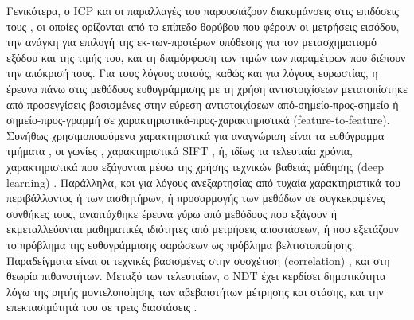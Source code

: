 Γενικότερα, ο ICP και οι παραλλαγές του παρουσιάζουν διακυμάνσεις στις
επιδόσεις τους \cite{Donoso2017b}, οι οποίες ορίζονται από το επίπεδο θορύβου
που φέρουν οι μετρήσεις εισόδου, την ανάγκη για επιλογή της εκ-των-προτέρων
υπόθεσης για τον μετασχηματισμό εξόδου και της τιμής του, και τη διαμόρφωση των
τιμών των παραμέτρων που διέπουν την απόκρισή τους. Για τους λόγους αυτούς,
καθώς και για λόγους ευρωστίας, η έρευνα πάνω στις μεθόδους ευθυγράμμισης με τη
χρήση αντιστοιχίσεων μετατοπίστηκε από προσεγγίσεις βασισμένες στην εύρεση
αντιστοιχίσεων από-σημείο-προς-σημείο ή σημείο-προς-γραμμή σε
χαρακτηριστικά-προς-χαρακτηριστικά (feature-to-feature). Συνήθως
χρησιμοποιούμενα χαρακτηριστικά για αναγνώριση είναι τα ευθύγραμμα τμήματα
\cite{XuZezhong,Mohamed2017,Wen2018}, οι γωνίες \cite{Wang2018b},
χαρακτηριστικά SIFT \cite{Li2016}, ή, ιδίως τα τελευταία χρόνια, χαρακτηριστικά
που εξάγονται μέσω της χρήσης τεχνικών βαθειάς μάθησης (deep learning)
\cite{Li2017,Li2020}. Παράλληλα, και για λόγους ανεξαρτησίας από τυχαία
χαρακτηριστικά του περιβάλλοντος ή των αισθητήρων, ή προσαρμογής των μεθόδων σε
συγκεκριμένες συνθήκες τους, αναπτύχθηκε έρευνα γύρω από μεθόδους που εξάγουν ή
εκμεταλλεύονται μαθηματικές ιδιότητες από μετρήσεις αποστάσεων, ή που εξετάζουν
το πρόβλημα της ευθυγράμμισης σαρώσεων ως πρόβλημα βελτιστοποίησης.
Παραδείγματα είναι οι τεχνικές βασισμένες στην συσχέτιση (correlation)
\cite{Olson2009a,Olson2015,Konecny2016}, και στη θεωρία πιθανοτήτων. Μεταξύ των
τελευταίων, o NDT έχει κερδίσει δημοτικότητα λόγω της ρητής μοντελοποίησης των
αβεβαιοτήτων μέτρησης και στάσης, και την επεκτασιμότητά του σε τρεις
διαστάσεις
\cite{Magnusson2007,Zhou2017,Wen2018a,Choi2019,Qingshan2019b,Lee2020}.

